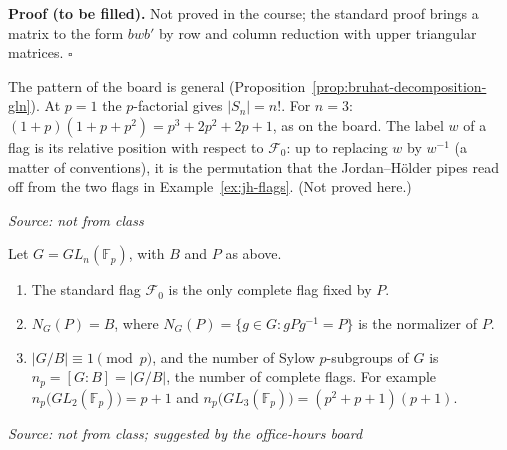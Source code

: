 \documentclass[11pt]{report}
\renewenvironment{proof}[1][Proof]{\noindent\textbf{#1.} }{\hfill$\square$\par\vspace{5pt}}
\newcommand{\srcline}[1]{\par\hfill{\footnotesize\textit{Source: #1}}}
\begin{document}
\begin{proof}[Proof (to be filled)]
Not proved in the course; the standard proof brings a matrix to the form $bwb'$ by row and column reduction with upper triangular matrices.
\end{proof}

\begin{rembox}\label{rem:bruhat-decomposition}
The pattern of the board is general (Proposition~\ref{prop:bruhat-decomposition-gln}). At $p = 1$ the $p$-factorial gives $|S_n| = n!$. For $n = 3$: $(1 + p)(1 + p + p^2) = p^3 + 2p^2 + 2p + 1$, as on the board. The label $w$ of a flag is its relative position with respect to $\mathcal{F}_0$: up to replacing $w$ by $w^{-1}$ (a matter of conventions), it is the permutation that the Jordan--H\"older pipes read off from the two flags in Example~\ref{ex:jh-flags}. (Not proved here.)
\srcline{not from class}
\end{rembox}

\begin{propbox}\label{prop:sylow-gln-flags}
Let $G = GL_n(\mathbb{F}_p)$, with $B$ and $P$ as above.
\begin{enumerate}
    \item The standard flag $\mathcal{F}_0$ is the only complete flag fixed by $P$.
    \item $N_G(P) = B$, where $N_G(P) = \{ g \in G : gPg^{-1} = P \}$ is the normalizer of $P$.
    \item $|G/B| \equiv 1 \pmod p$, and the number of Sylow $p$-subgroups of $G$ is $n_p = [G : B] = |G/B|$, the number of complete flags. For example $n_p\big(GL_2(\mathbb{F}_p)\big) = p + 1$ and $n_p\big(GL_3(\mathbb{F}_p)\big) = (p^2 + p + 1)(p + 1)$.
\end{enumerate}
\srcline{not from class; suggested by the office-hours board}
\end{propbox}
\end{document}
